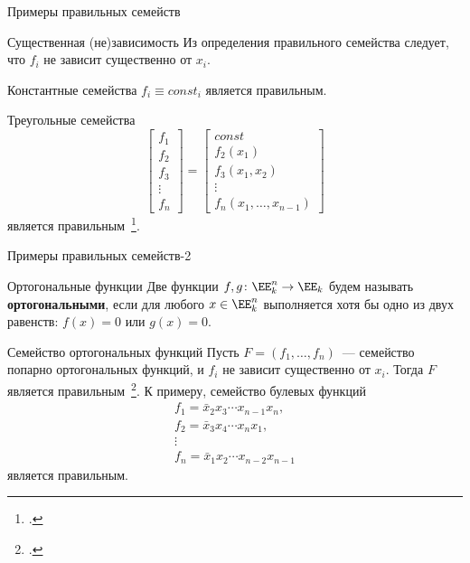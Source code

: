 \begin{frame}{Примеры правильных семейств}
    \begin{block}{Существенная (не)зависимость}
        Из определения правильного семейства следует, что $f_i$ не зависит существенно от $x_i$.
    \end{block}
    \pause
    \begin{block}{Константные семейства}
        $f_i \equiv const_i$ является правильным.
    \end{block}
    \pause 
    \begin{block}{Треугольные семейства}
        \[
            \begin{bmatrix}
                f_1 \\
                f_2 \\
                f_3 \\
                \vdots \\
                f_n 
            \end{bmatrix}
            =
            \begin{bmatrix}
                const \\
                f_{2}(x_{1}) \\
                f_{3}(x_{1}, x_{2}) \\
                \vdots \\
                f_{n}(x_{1}, \ldots, x_{n-1})
            \end{bmatrix}
        \]
        является правильным~\footcite{nosov06abel}.
    \end{block}
\end{frame}


\begin{frame}{Примеры правильных семейств-2}
    \begin{block}{Ортогональные функции}
        Две функции $f, g \colon \EE_k^n \to \EE_k$ будем называть \textbf{ортогональными}, если для любого $x \in \EE_k^n$ выполняется хотя бы одно из двух равенств: $f(x) = 0$ или $g(x) = 0$. 
    \end{block}
    \pause
    \begin{block}{Семейство ортогональных функций}
        Пусть $F = (f_1, \ldots, f_n)$~--- семейство попарно ортогональных функций, и $f_i$ не зависит существенно от $x_i$.
        Тогда $F$ является правильным~\footcite{nosov08}. 
        \pause
        К примеру, семейство булевых функций
        \begin{gather*}
            \label{OrthogExample}
            f_1 =\bar{x}_2 x_3 \cdots x_{n-1} x_n,\\
            f_2 =\bar{x}_3 x_4 \cdots x_{n} x_1,\\
            \vdots \\
            f_n =\bar{x}_1 x_2 \cdots x_{n-2} x_{n-1}
        \end{gather*}
        является правильным.
    \end{block}
\end{frame}


